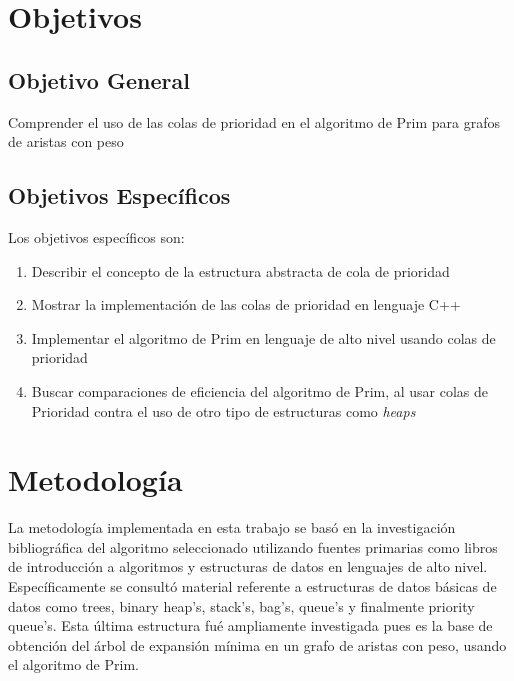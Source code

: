 \documentclass[letterpaper]{article}
\begin{document}
\section{Objetivos}

\subsection{Objetivo General}

Comprender el uso de las colas de prioridad en el algoritmo de Prim para grafos de aristas con peso

\subsection{Objetivos Específicos}

Los objetivos específicos son:\\

\begin{enumerate}
\item Describir el concepto de la estructura abstracta de cola de prioridad
\item Mostrar la implementación de las colas de prioridad en lenguaje C++
\item Implementar el algoritmo de Prim en lenguaje de alto nivel usando colas de prioridad
\item Buscar comparaciones de eficiencia del algoritmo de Prim, al usar colas de Prioridad contra el uso de otro tipo de estructuras como \textit{heaps}
\end{enumerate}

\section{Metodología}

La metodología implementada en esta trabajo se basó en la investigación bibliográfica del algoritmo seleccionado utilizando fuentes primarias como libros de introducción a algoritmos y estructuras de datos en lenguajes de alto nivel. Específicamente se consultó material referente a estructuras de datos básicas de datos como trees, binary heap's, stack's, bag's, queue's y finalmente priority queue's. Esta última estructura fué ampliamente investigada pues es la base de obtención del árbol de expansión mínima en un grafo de aristas con peso, usando el algoritmo de Prim.
\end{document}

